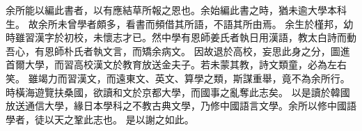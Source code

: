 余所能以編此書者，以有應結草所報之恩也。余始編此書之時，猶未逾大學本科生。
故余所未曾學者頗多，看書而頻借其所語，不語其所由焉。
余生於槿邦，幼時雖習漢字於初校，未懷志才已。然中學有恩師姜氏者執日用漢語，教太白詩而動吾心，有恩師朴氏者執文言，而矯余病文。
因故退於高校，妄思此身之分，圖進首爾大學，而習高校漢文於教育放送金夫子。若未蒙其教，詩文類童，必為左右笑。
雖竭力而習漢文，而遠東文、英文、算學之類，斯謀重舉，竟不為余所行。時橫海遊覽扶桑國，欲讀和文於京都大學，而國事之亂奪此志矣。
以是讀於韓國放送通信大學，緣日本學科之不教古典文學，乃修中國語言文學。余所以修中國語學者，徒以天之鞏此志也。
是以謝之如此。